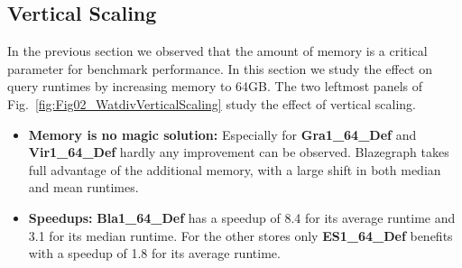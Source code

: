 \documentclass[twocolumn]{bmcart}%
\begin{document}
\subsection{Vertical Scaling}
\label{subsec:vscaling}
%

%

%
%
In the previous section we observed that the amount of memory is a critical parameter for benchmark performance. 
In this section we study the effect on query runtimes by increasing memory to 64GB.
The two leftmost panels of Fig.~\ref{fig:Fig02_WatdivVerticalScaling} study the effect of vertical scaling. 
%

\begin{itemize}
	\item \textbf{Memory is no magic solution:} Especially for \textbf{Gra1\_64\_Def} and \textbf{Vir1\_64\_Def} hardly any improvement can be observed. Blazegraph takes full advantage of the additional memory, with a large shift in both median and mean runtimes. %
	\item \textbf{Speedups:} \textbf{Bla1\_64\_Def} has a speedup of 8.4 for its average runtime and 3.1 for its median runtime. For the other stores only \textbf{ES1\_64\_Def} benefits with a speedup of 1.8 for its average runtime.
\end{itemize}
\end{document}
